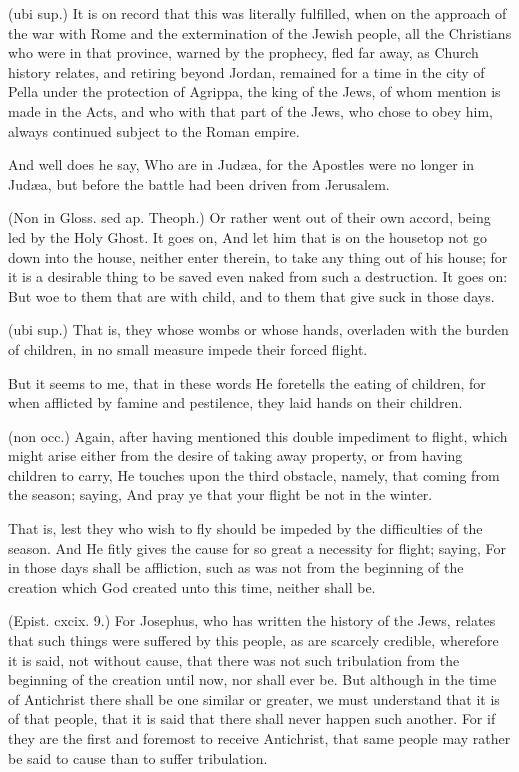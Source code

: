  (ubi sup.) It is on record that this was literally fulfilled, when on the approach of the war with Rome and the extermination of the Jewish people, all the Christians who were in that province, warned by the prophecy, fled far away, as Church history relates, and retiring beyond Jordan, remained for a time in the city of Pella under the protection of Agrippa, the king of the Jews, of whom mention is made in the Acts, and who with that part of the Jews, who chose to obey him, always continued subject to the Roman empire.

 And well does he say, Who are in Judæa, for the Apostles were no longer in Judæa, but before the battle had been driven from Jerusalem.

 (Non in Gloss. sed ap. Theoph.) Or rather went out of their own accord, being led by the Holy Ghost. It goes on, And let him that is on the housetop not go down into the house, neither enter therein, to take any thing out of his house; for it is a desirable thing to be saved even naked from such a destruction. It goes on: But woe to them that are with child, and to them that give suck in those days.

 (ubi sup.) That is, they whose wombs or whose hands, overladen with the burden of children, in no small measure impede their forced flight.

 But it seems to me, that in these words He foretells the eating of children, for when afflicted by famine and pestilence, they laid hands on their children.

 (non occ.) Again, after having mentioned this double impediment to flight, which might arise either from the desire of taking away property, or from having children to carry, He touches upon the third obstacle, namely, that coming from the season; saying, And pray ye that your flight be not in the winter.

 That is, lest they who wish to fly should be impeded by the difficulties of the season. And He fitly gives the cause for so great a necessity for flight; saying, For in those days shall be affliction, such as was not from the beginning of the creation which God created unto this time, neither shall be.

 (Epist. cxcix. 9.) For Josephus, who has written the history of the Jews, relates that such things were suffered by this people, as are scarcely credible, wherefore it is said, not without cause, that there was not such tribulation from the beginning of the creation until now, nor shall ever be. But although in the time of Antichrist there shall be one similar or greater, we must understand that it is of that people, that it is said that there shall never happen such another. For if they are the first and foremost to receive Antichrist, that same people may rather be said to cause than to suffer tribulation.

